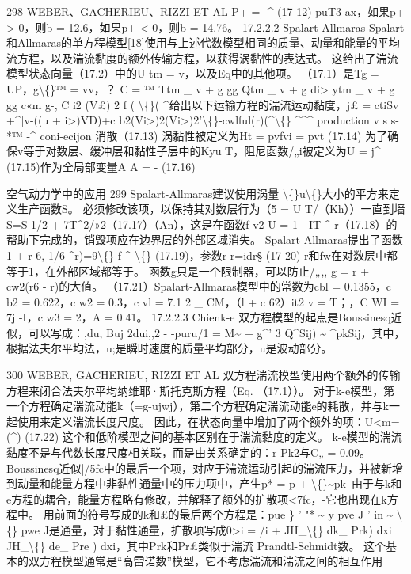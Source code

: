 \documentclass[UTF8,11pt,a4paper,openany,fontset=fandol]{ctexbook}
\begin{document}
298 WEBER、GACHERIEU、RIZZI ET AL P+ = -\textasciicircum{} (17-12) puT3 ax，如果p+ > 0，则b = 12.6，如果p+ < 0，则b = 14.76。 17.2.2.2 Spalart-Allmaras Spalart和Allmaras的单方程模型[18]使用与上述代数模型相同的质量、动量和能量的平均流方程，以及湍流黏度的额外传输方程，以获得涡黏性的表达式。 这给出了湍流模型状态向量（17.2）中的U tm = v，以及Eq中的其他项。 （17.1）是Tg = UP，g\textbackslash\{\}™ = vv，？ C = ™ Ttm \_ v + g gg Qtm \_ v + g di> ytm \_ v + g gg c«m g-, C i2 (V£) 2 f ( \textbackslash\{\}( \textasciicircum{}给出以下运输方程的湍流运动黏度，j£ = ctiSv +\textasciicircum{}[v-((u + i>)VD)+c b2(Vi>)2(Vi>)2'\textbackslash\{\}-cwlful(r)(\textasciicircum{}\textbackslash\{\} \textasciicircum{}\textasciicircum{}\textasciicircum{} production v s s-*™ -\textasciicircum{} coni-ecijon 消散（17.13) 涡黏性被定义为Ht = pvfvi = pvt (17.14) 为了确保v等于对数层、缓冲层和黏性子层中的Kyu T，阻尼函数/„i被定义为U = j\textasciicircum{} (17.15)作为全局部变量A A = - (17.16)

空气动力学中的应用 299 Spalart-Allmaras建议使用涡量 \textbackslash\{\}u\textbackslash\{\}大小的平方来定义生产函数S。 必须修改该项，以保持其对数层行为（5 = U T/（Kh））一直到墙S=S 1/2 + 7T\textasciicircum{}2/»2（17.17）（An），这是在函数f v2 U = 1 - IT \textasciicircum{} r（17.18）的帮助下完成的，销毁项应在边界层的外部区域消失。 Spalart-Allmaras提出了函数1 + r 6, 1/6 \textasciicircum{}r)=9\textbackslash\{\}-f-\textasciicircum{}-\textbackslash\{\} (17.19)，参数r r=idr§ (17-20) r和fw在对数层中都等于1，在外部区域都等于。 函数g只是一个限制器，可以防止/„,, g = r + cw2(r6 - r)的大值。 （17.21）Spalart-Allmaras模型中的常数为cbl = 0.1355，c b2 = 0.622，c w2 = 0.3，c vl = 7.1 2 \_ CM，（l + c 62）it2 v = T；，C WI = 7j -I，c w3 = 2，A = 0.41。 17.2.2.3 Chienk-e 双方程模型的起点是Boussinesq近似，可以写成：,du, Buj 2dui,,2 - -puru/1 = M\textasciitilde{} + g\textasciicircum{}' 3 Q\textasciicircum{}Sij) \textasciitilde{} \textasciicircum{}pkSij，其中，根据法夫尔平均法，u;是瞬时速度的质量平均部分，u是波动部分。

300 WEBER, GACHERIEU, RIZZI ET AL 双方程湍流模型使用两个额外的传输方程来闭合法夫尔平均纳维耶·斯托克斯方程（Eq. （17.1））。 对于k-e模型，第一个方程确定湍流动能k（=g-ujwj），第二个方程确定湍流动能e的耗散，并与k一起使用来定义湍流长度尺度。 因此，在状态向量中增加了两个额外的项：U<m=(\textasciicircum{}) (17.22) 这个和低阶模型之间的基本区别在于湍流黏度的定义。 k-e模型的湍流黏度不是与代数长度尺度相关联，而是由关系确定的：r Pk2与C„ = 0.09。 Boussinesq近似|/5fc中的最后一个项，对应于湍流运动引起的湍流压力，并被新增到动量和能量方程中非黏性通量中的压力项中，产生p* = p + \textbackslash\{\}\textasciitilde{}pk--由于与k和e方程的耦合，能量方程略有修改，并解释了额外的扩散项<7fc，-它也出现在k方程中。 用前面的符号写成的k和£的最后两个方程是：pue \} ' "* \textasciitilde{} y pve J ' in \textasciitilde{} \textbackslash\{\} pwe J是通量，对于黏性通量，扩散项写成0>i = /i + JH\_\textbackslash\{\} dk\_ Prk) dxi JH\_\textbackslash\{\} de\_ Pre ) dxi，其中Prk和Pr£类似于湍流 Prandtl-Schmidt数。 这个基本的双方程模型通常是“高雷诺数”模型，它不考虑湍流和湍流之间的相互作用
\end{document}
